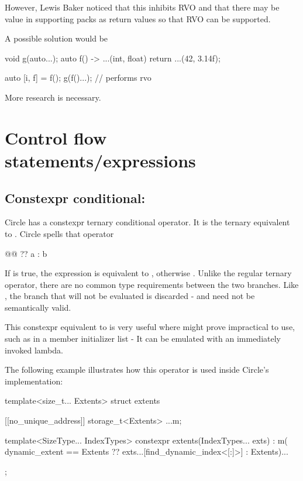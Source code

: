 \documentclass{wg21}
\begin{document}
However, Lewis Baker noticed that this inhibits RVO and that there may be value in supporting packs as return values so that RVO can be supported.

A possible solution would be

\begin{colorblock}
void g(auto...);
auto f() -> ...(int, float) {
    return ...(42, 3.14f);
}

auto [i, f] = f();
g(f()...); // performs rvo
\end{colorblock}


More research is necessary.

\section{Control flow statements/expressions}
\label{sec:constexprternary}


\subsection{Constexpr conditional: }

Circle has a constexpr ternary conditional operator.
It is the ternary equivalent to .
Circle spells that operator 

\begin{colorblock}
@@ ?? a : b
\end{colorblock}

If  is true, the expression is equivalent to , otherwise .
Unlike the regular ternary operator, there are no common type requirements between the two branches.
Like , the branch that will not be evaluated is discarded - and need not be semantically valid.

This constexpr equivalent to  is very useful where  might prove impractical to use, such as
in a member initializer list - It can be emulated with an immediately invoked lambda.

The following example illustrates how this operator is used inside Circle's  implementation:

\begin{colorblock}
template<size_t... Extents>
struct extents {
    [[no_unique_address]] storage_t<Extents> ...m;

    template<SizeType... IndexTypes>
    constexpr extents(IndexTypes... exts) :
        m( dynamic_extent == Extents ??  exts...[find_dynamic_index<[:]>] : Extents)... { }
};
\end{colorblock}
\end{document}
